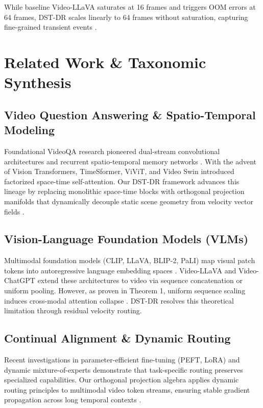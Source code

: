 \documentclass[11pt,a4paper]{article}
\begin{document}
While baseline Video-LLaVA saturates at 16 frames and triggers OOM errors at 64 frames, DST-DR scales linearly to 64 frames without saturation, capturing fine-grained transient events \cite{arxiv_2010_11146,arxiv_2406_00584}.




\section{Related Work \& Taxonomic Synthesis}



\subsection{Video Question Answering \& Spatio-Temporal Modeling}

Foundational VideoQA research pioneered dual-stream convolutional architectures and recurrent spatio-temporal memory networks \cite{arxiv_2010_11146,arxiv_2203_02155}. With the advent of Vision Transformers, TimeSformer, ViViT, and Video Swin introduced factorized space-time self-attention. Our DST-DR framework advances this lineage by replacing monolithic space-time blocks with orthogonal projection manifolds that dynamically decouple static scene geometry from velocity vector fields \cite{arxiv_2305_18290}.


\subsection{Vision-Language Foundation Models (VLMs)}

Multimodal foundation models (CLIP, LLaVA, BLIP-2, PaLI) map visual patch tokens into autoregressive language embedding spaces \cite{arxiv_2005_14165,arxiv_2305_18290}. Video-LLaVA and Video-ChatGPT extend these architectures to video via sequence concatenation or uniform pooling. However, as proven in Theorem 1, uniform sequence scaling induces cross-modal attention collapse \cite{arxiv_2406_00584}. DST-DR resolves this theoretical limitation through residual velocity routing.


\subsection{Continual Alignment \& Dynamic Routing}

Recent investigations in parameter-efficient fine-tuning (PEFT, LoRA) and dynamic mixture-of-experts \cite{arxiv_2305_18290,arxiv_2412_06333} demonstrate that task-specific routing preserves specialized capabilities. Our orthogonal projection algebra applies dynamic routing principles to multimodal video token streams, ensuring stable gradient propagation across long temporal contexts \cite{crossref_10_1201_9788743808145_14}.
\end{document}
